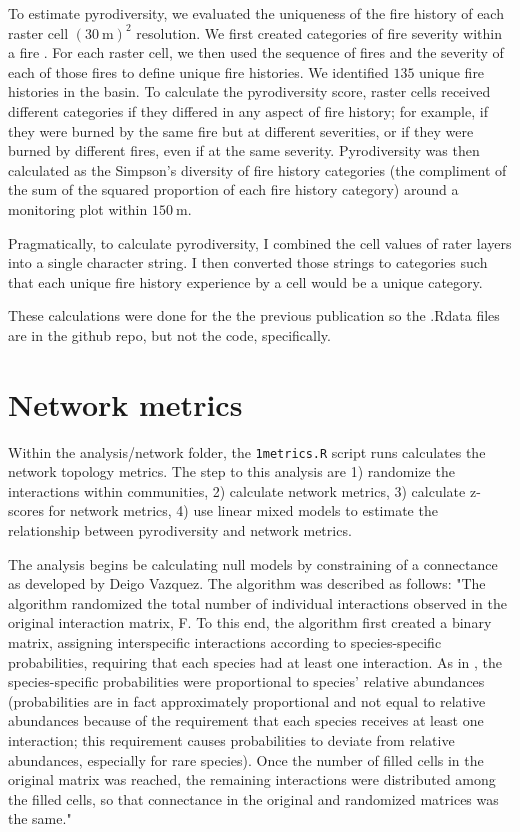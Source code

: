 \documentclass{article}\usepackage[]{graphicx}\usepackage[]{color}
\begin{document}
To estimate pyrodiversity, we evaluated the uniqueness of the fire
history of each raster cell $(30~\mathrm{m})^2$ resolution. We first
created categories of fire severity within a fire
\citep{miller2012Yosemite}. For each raster cell, we then used the
sequence of fires and the severity of each of those fires to define
unique fire histories.  We identified $135$ unique fire histories in
the basin.  To calculate the pyrodiversity score, raster cells
received different categories if they differed in any aspect of fire
history; for example, if they were burned by the same fire but at
different severities, or if they were burned by different fires, even
if at the same severity.  Pyrodiversity was then calculated as the
Simpson's diversity of fire history categories (the compliment of the
sum of the squared proportion of each fire history category) around a
monitoring plot within $150~\mathrm{m}$.

Pragmatically, to calculate pyrodiversity, I combined the cell
values of rater layers into a single character string. I then
converted those strings to categories such that each unique fire
history experience by a cell would be a unique category.

These calculations were done for the the previous publication so the
.Rdata files are in the github repo, but not the code, specifically.

\section{Network metrics}
\label{sec:metrics}

Within the analysis/network folder, the \texttt{1metrics.R} script
runs calculates the network topology metrics. The step to this
analysis are 1) randomize the interactions within communities, 2)
calculate network metrics, 3) calculate z-scores for network metrics,
4) use linear mixed models to estimate the relationship between
pyrodiversity and network metrics.

The analysis begins be calculating null models by constraining of a
connectance as developed by Deigo Vazquez. The algorithm was described
as follows: "The algorithm randomized the total number of individual
interactions observed in the original interaction matrix, F. To this
end, the algorithm first created a binary matrix, assigning
interspecific interactions according to species-specific
probabilities, requiring that each species had at least one
interaction. As in \citep{vazquez2007species}, the species-specific
probabilities were proportional to species' relative abundances
(probabilities are in fact approximately proportional and not equal to
relative abundances because of the requirement that each species
receives at least one interaction; this requirement causes
probabilities to deviate from relative abundances, especially for rare
species). Once the number of filled cells in the original matrix was
reached, the remaining interactions were distributed among the filled
cells, so that connectance in the original and randomized matrices was
the same." \citep[][page 1122-1123]{vazquez2007species}
\end{document}
